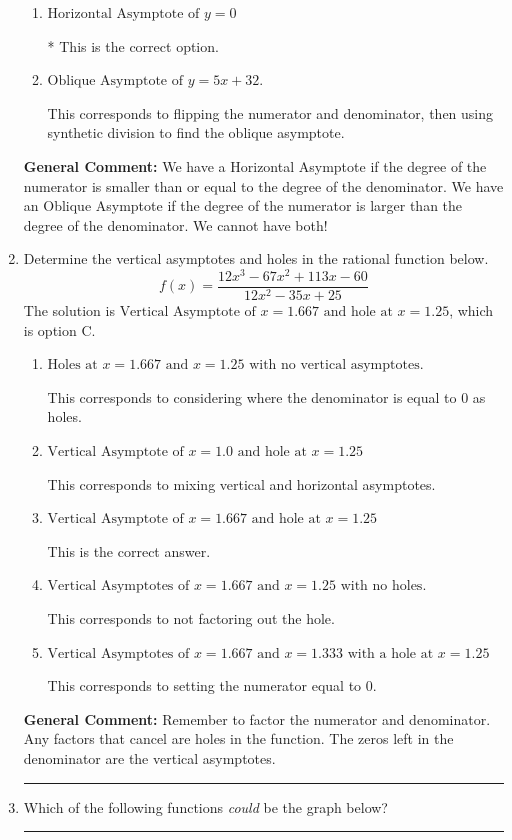 \documentclass{extbook}[14pt]
\newcommand{\litem}[1]{\item #1

\rule{\textwidth}{0.4pt}}
\begin{document}
\begin{enumerate}
{\begin{enumerate}[label=\Alph*.]
This corresponds to believing there can be both a horizontal and oblique asymptote.
\item \( \text{Horizontal Asymptote of } y = 0 \)

* This is the correct option.
\item \( \text{Oblique Asymptote of } y = 5x + 32. \)

This corresponds to flipping the numerator and denominator, then using synthetic division to find the oblique asymptote.
\end{enumerate}

\textbf{General Comment:} We have a Horizontal Asymptote if the degree of the numerator is smaller than or equal to the degree of the denominator. We have an Oblique Asymptote if the degree of the numerator is larger than the degree of the denominator. We cannot have both!
}
\litem{
Determine the vertical asymptotes and holes in the rational function below.
\[ f(x) = \frac{12x^{3} -67 x^{2} +113 x -60}{12x^{2} -35 x + 25} \]The solution is \( \text{Vertical Asymptote of } x = 1.667 \text{ and hole at } x = 1.25 \), which is option C.\begin{enumerate}[label=\Alph*.]
\item \( \text{Holes at } x = 1.667 \text{ and } x = 1.25 \text{ with no vertical asymptotes.} \)

This corresponds to considering where the denominator is equal to 0 as holes.
\item \( \text{Vertical Asymptote of } x = 1.0 \text{ and hole at } x = 1.25 \)

This corresponds to mixing vertical and horizontal asymptotes.
\item \( \text{Vertical Asymptote of } x = 1.667 \text{ and hole at } x = 1.25 \)

This is the correct answer.
\item \( \text{Vertical Asymptotes of } x = 1.667 \text{ and } x = 1.25 \text{ with no holes.} \)

This corresponds to not factoring out the hole.
\item \( \text{Vertical Asymptotes of } x = 1.667 \text{ and } x = 1.333 \text{ with a hole at } x = 1.25 \)

This corresponds to setting the numerator equal to 0.
\end{enumerate}

\textbf{General Comment:} Remember to factor the numerator and denominator. Any factors that cancel are holes in the function. The zeros left in the denominator are the vertical asymptotes.
}
\litem{
Which of the following functions \textit{could} be the graph below?

}
\end{enumerate}
\end{document}
